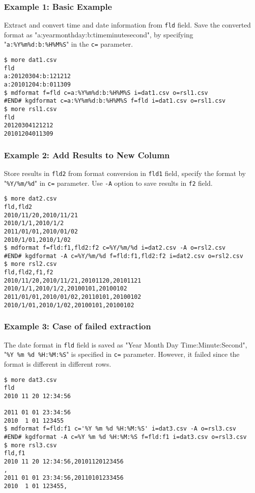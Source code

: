 \subsubsection*{Example 1: Basic Example}

Extract and convert time and date information from \verb|fld| field.
Save the converted format as
"a:yearmonthday:b:timeminutesecond", by specifying "\verb|a:%Y%m%d:b:%H%M%S|"
in the \verb|c=| parameter.


\begin{Verbatim}[baselinestretch=0.7,frame=single]
$ more dat1.csv
fld
a:20120304:b:121212
a:20101204:b:011309
$ mdformat f=fld c=a:%Y%m%d:b:%H%M%S i=dat1.csv o=rsl1.csv
#END# kgdformat c=a:%Y%m%d:b:%H%M%S f=fld i=dat1.csv o=rsl1.csv
$ more rsl1.csv
fld
20120304121212
20101204011309
\end{Verbatim}
\subsubsection*{Example 2: Add Results to New Column}

Store results in \verb|fld2| from format conversion in \verb|fld1| field,
specify the format by "\verb|%Y/%m/%d|" in \verb|c=| parameter.
Use \verb|-A| option to save results in \verb|f2| field.


\begin{Verbatim}[baselinestretch=0.7,frame=single]
$ more dat2.csv
fld,fld2
2010/11/20,2010/11/21
2010/1/1,2010/1/2
2011/01/01,2010/01/02
2010/1/01,2010/1/02
$ mdformat f=fld:f1,fld2:f2 c=%Y/%m/%d i=dat2.csv -A o=rsl2.csv
#END# kgdformat -A c=%Y/%m/%d f=fld:f1,fld2:f2 i=dat2.csv o=rsl2.csv
$ more rsl2.csv
fld,fld2,f1,f2
2010/11/20,2010/11/21,20101120,20101121
2010/1/1,2010/1/2,20100101,20100102
2011/01/01,2010/01/02,20110101,20100102
2010/1/01,2010/1/02,20100101,20100102
\end{Verbatim}
\subsubsection*{Example 3: Case of failed extraction}

The date format in \verb|fld| field is saved as "Year Month Day Time:Minute:Second",
"\verb|%Y %m %d %H:%M:%S|" is specified in \verb|c=| parameter.
However, it failed since the format is different in different rows.


\begin{Verbatim}[baselinestretch=0.7,frame=single]
$ more dat3.csv
fld
2010 11 20 12:34:56

2011 01 01 23:34:56
2010  1 01 123455
$ mdformat f=fld:f1 c='%Y %m %d %H:%M:%S' i=dat3.csv -A o=rsl3.csv
#END# kgdformat -A c=%Y %m %d %H:%M:%S f=fld:f1 i=dat3.csv o=rsl3.csv
$ more rsl3.csv
fld,f1
2010 11 20 12:34:56,20101120123456
,
2011 01 01 23:34:56,20110101233456
2010  1 01 123455,
\end{Verbatim}
